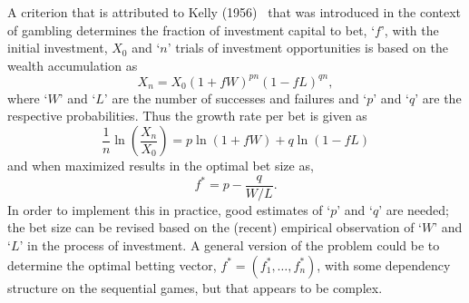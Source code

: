 A criterion that is attributed to Kelly (1956)~\cite{kelly56} that was introduced in the context of gambling determines the fraction of investment capital to bet, `$f$', with the initial investment, $X_0$ and `$n$' trials of investment opportunities is based on the wealth accumulation as
	\begin{equation} \label{eqn:xmx01f}
	X_n= X_0(1+fW)^{pn} (1-fL)^{qn},
	\end{equation}
where `$W$' and `$L$' are the number of successes and failures and `$p$' and `$q$' are the respective probabilities. Thus the growth rate per bet is given as
	\begin{equation} \label{eqn:1nln}
	\dfrac{1}{n} \ln \left(\dfrac{X_n}{X_0}\right)= p \ln(1+fW) + q \ln(1-fL)
	\end{equation}
and when maximized results in the optimal bet size as,
	\begin{equation} \label{eqn:fstarp}
	f^*= p - \dfrac{q}{W/L}.
	\end{equation}
In order to implement this in practice, good estimates of `$p$' and `$q$' are needed; the bet size can be revised based on the (recent) empirical observation of `$W$' and `$L$' in the process of investment. A general version of the problem could be to determine the optimal betting vector, $f^*=(f_1^*, \ldots, f_n^*)$, with some dependency structure on the sequential games, but that appears to be complex. 


